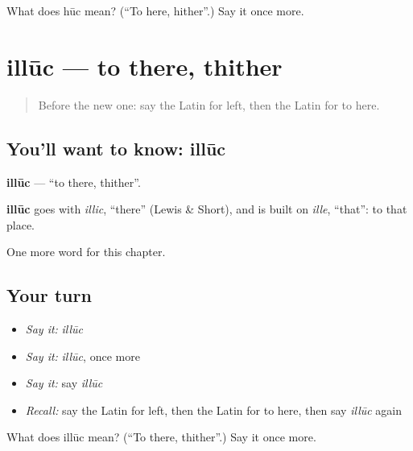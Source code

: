 \begin{tcolorbox}[breakable,colback=teal!4,colframe=teal!35!black,title={Before you move on}]
What does hūc mean? (\textquotedblleft{}To here, hither\textquotedblright{}.) Say it once more.
\end{tcolorbox}
\section[illūc]{illūc — to there, thither}

\label{lesson:LA-C115-illuc}



\begin{quote}
Before the new one: say the Latin for left, then the Latin for to here.
\end{quote}

\subsection*{You'll want to know: illūc}
\textbf{illūc} — \textquotedblleft{}to there, thither\textquotedblright{}.

\begin{cousinweb}
\textbf{illūc} goes with \emph{illic}, \textquotedblleft{}there\textquotedblright{} (Lewis \& Short), and is built on \emph{ille}, \textquotedblleft{}that\textquotedblright{}: to that place.
\end{cousinweb}

\begin{grammarlens}[title={What you've built}]
One more word for this chapter.
\end{grammarlens}

\subsection*{Your turn}
\begin{itemize}
\raggedright
  \item \emph{Say it:} \emph{illūc}
  \item \emph{Say it:} \emph{illūc}, once more
  \item \emph{Say it:} say \emph{illūc}
  \item \emph{Recall:} say the Latin for left, then the Latin for to here, then say \emph{illūc} again
\end{itemize}

\begin{tcolorbox}[breakable,colback=teal!4,colframe=teal!35!black,title={Before you move on}]
What does illūc mean? (\textquotedblleft{}To there, thither\textquotedblright{}.) Say it once more.
\end{tcolorbox}
